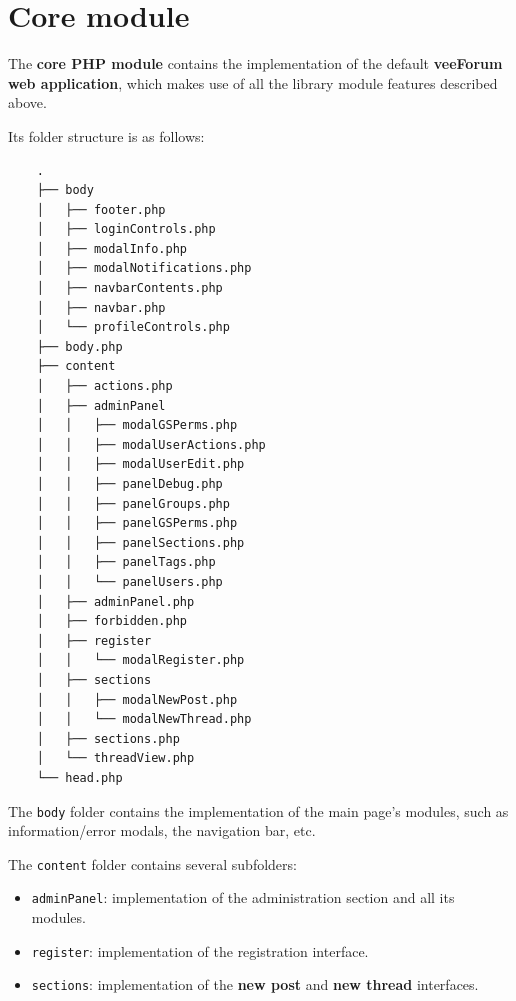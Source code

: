 \documentclass[12pt]{report}
\renewcommand\emph{\textbf}
\begin{document}
            \section{Core module}

                The \emph{core PHP module} contains the implementation of the default \emph{veeForum web application}, which makes use of all the library module features described above.

                Its folder structure is as follows:

                \begin{verbatim}
    .
    ├── body
    │   ├── footer.php
    │   ├── loginControls.php
    │   ├── modalInfo.php
    │   ├── modalNotifications.php
    │   ├── navbarContents.php
    │   ├── navbar.php
    │   └── profileControls.php
    ├── body.php
    ├── content
    │   ├── actions.php
    │   ├── adminPanel
    │   │   ├── modalGSPerms.php
    │   │   ├── modalUserActions.php
    │   │   ├── modalUserEdit.php
    │   │   ├── panelDebug.php
    │   │   ├── panelGroups.php
    │   │   ├── panelGSPerms.php
    │   │   ├── panelSections.php
    │   │   ├── panelTags.php
    │   │   └── panelUsers.php
    │   ├── adminPanel.php
    │   ├── forbidden.php
    │   ├── register
    │   │   └── modalRegister.php
    │   ├── sections
    │   │   ├── modalNewPost.php
    │   │   └── modalNewThread.php
    │   ├── sections.php
    │   └── threadView.php
    └── head.php
                \end{verbatim}

                The \texttt{body} folder contains the implementation of the main page's modules, such as information/error modals, the navigation bar, etc.

                The \texttt{content} folder contains several subfolders:

                \begin{itemize}
                    \item \texttt{adminPanel}: implementation of the administration section and all its modules.
                    \item \texttt{register}: implementation of the registration interface.
                    \item \texttt{sections}: implementation of the \emph{new post} and \emph{new thread} interfaces.
                \end{itemize}
\end{document}
